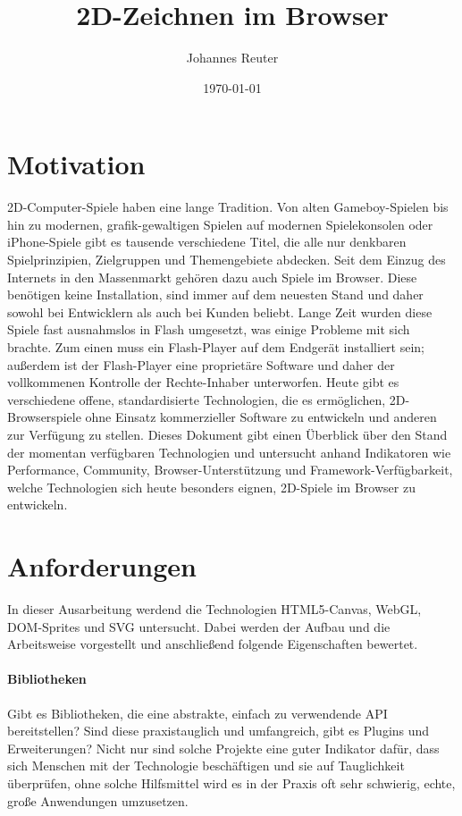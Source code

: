 \documentclass[a4paper, 12pt]{article}
\title{2D-Zeichnen im Browser}
\author{Johannes Reuter}
\date{\today}
\begin{document}
\maketitle
\newpage
\tableofcontents
\newpage
\section{Motivation}
2D-Computer-Spiele haben eine lange Tradition. Von alten Gameboy-Spielen bis hin zu modernen, grafik-gewaltigen Spielen auf modernen Spielekonsolen oder iPhone-Spiele gibt es tausende verschiedene Titel, die alle nur denkbaren Spielprinzipien, Zielgruppen und Themengebiete abdecken. Seit dem Einzug des Internets in den Massenmarkt gehören dazu auch Spiele im Browser.
Diese benötigen keine Installation, sind immer auf dem neuesten Stand und daher sowohl bei Entwicklern als auch bei Kunden beliebt. Lange Zeit wurden diese Spiele fast ausnahmslos in Flash umgesetzt, was einige Probleme mit sich brachte. Zum einen muss ein Flash-Player auf dem Endgerät installiert sein; außerdem ist der Flash-Player eine proprietäre Software und daher der vollkommenen Kontrolle der Rechte-Inhaber unterworfen. Heute gibt es verschiedene offene, standardisierte Technologien, die es ermöglichen, 2D-Browserspiele ohne Einsatz kommerzieller Software zu entwickeln und anderen zur Verfügung zu stellen. Dieses Dokument gibt einen Überblick über den Stand der momentan verfügbaren Technologien und untersucht anhand Indikatoren wie Performance, Community, Browser-Unterstützung und Framework-Verfügbarkeit, welche Technologien sich heute besonders eignen, 2D-Spiele im Browser zu entwickeln.
\section{Anforderungen}
In dieser Ausarbeitung werdend die Technologien HTML5-Canvas, WebGL, DOM-Sprites und SVG untersucht. Dabei werden der Aufbau und die Arbeitsweise vorgestellt und anschließend folgende Eigenschaften bewertet.
\paragraph{Bibliotheken}
Gibt es Bibliotheken, die eine abstrakte, einfach zu verwendende API bereitstellen? Sind diese praxistauglich und umfangreich, gibt es Plugins und Erweiterungen? Nicht nur sind solche Projekte eine guter Indikator dafür, dass sich Menschen mit der Technologie beschäftigen und sie auf Tauglichkeit überprüfen, ohne solche Hilfsmittel wird es in der Praxis oft sehr schwierig, echte, große Anwendungen umzusetzen.
\end{document}
